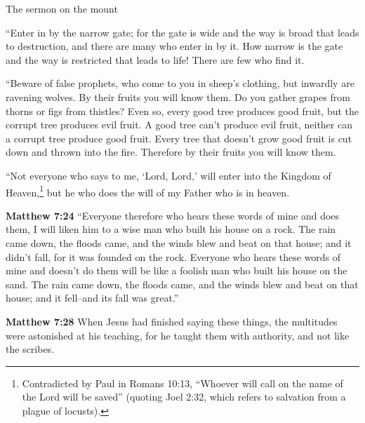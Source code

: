 \documentclass[10pt,twoside]{article} %
\newcommand{\quotesize}{\normalsize{}}
\newenvironment{quotetext}{\begingroup\quotesize}{\endgroup}
\newcommand{\intex}[1]{\index[texts]{#1}}
\newcommand{\bible}[2]{\begin{quotetext}\textbf{#1}\intex{#1} #2\end{quotetext}}
\newcommand{\matthew}[2]{\bible{Matthew #1}{#2}}
\begin{document}
\begin{section}{The sermon on the mount}
{   ``Enter in by the narrow gate; for the gate is wide and the way is broad that leads to destruction, and there are many who enter in by it.    How narrow is the gate and the way is restricted that leads to life! There are few who find it.

   ``Beware of false prophets, who come to you in sheep's clothing, but inwardly are ravening wolves.    By their fruits you will know them. Do you gather grapes from thorns or figs from thistles?    Even so, every good tree produces good fruit, but the corrupt tree produces evil fruit.    A good tree can't produce evil fruit, neither can a corrupt tree produce good fruit.    Every tree that doesn't grow good fruit is cut down and thrown into the fire.    Therefore by their fruits you will know them.

   ``Not everyone who says to me, `Lord, Lord,' will enter into the Kingdom of 
Heaven,\footnote{Contradicted by Paul in Romans 10:13, ``Whoever will call on the name of the Lord will be saved''
(quoting Joel 2:32, which refers to salvation from a plague of locusts).\label{paul-contradicts-gospels}} but he who does the will of my Father who is in heaven.
}

\matthew{7:24}{
  ``Everyone therefore who hears these words of mine and does them, I will liken him to a wise man who built his house on a rock.    The rain came down, the floods came, and the winds blew and beat on that house; and it didn't fall, for it was founded on the rock.    Everyone who hears these words of mine and doesn't do them will be like a foolish man who built his house on the sand.    The rain came down, the floods came, and the winds blew and beat on that house; and it fell--and its fall was great.''
}

\matthew{7:28}{
  When Jesus had finished saying these things, the multitudes were astonished at his teaching,   for he taught them with authority, and not like the scribes.
}

\end{section}
\end{document}
